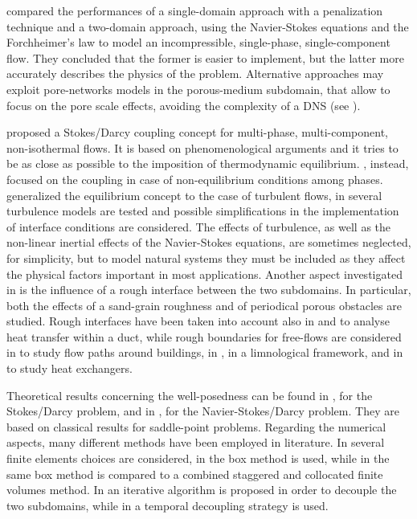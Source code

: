 \textcite{intro:discacim} compared the performances of a single-domain approach with a penalization technique and a 
two-domain approach, using the Navier-Stokes equations and the Forchheimer's 
law to model an incompressible, single-phase, single-component flow. They 
concluded that the former is easier to implement, but the latter more accurately describes the physics of the problem. Alternative approaches may exploit 
pore-networks models in the porous-medium subdomain, that allow to focus on the 
pore scale effects, avoiding the complexity of a DNS (see \cite{paper:kilian}).

\textcite{paper:mosthaf} proposed a Stokes/Darcy coupling concept for multi-phase, 
multi-component, non-isothermal flows. It is based on phenomenological arguments and it tries to be as close as possible to the 
imposition of thermodynamic equilibrium. \textcite{intro:davarzani}, instead, focused on the coupling in case of non-equilibrium conditions among phases.
\textcite{paper:fetzer} generalized the equilibrium concept to the case of 
turbulent flows, in \cite{tesi:fetzer} several turbulence models are tested and 
possible simplifications in the implementation of interface conditions are 
considered. The effects of turbulence, as well as the non-linear inertial 
effects of the Navier-Stokes equations, are sometimes neglected, for 
simplicity, 
but to model natural systems they must be included as they
affect the physical factors important in most applications.
Another aspect investigated in 
\cite{tesi:fetzer} is the influence of a rough interface between the two 
subdomains. In particular, both the effects of a sand-grain roughness and of 
periodical porous obstacles are studied.
Rough interfaces have been taken into account also in \cite{intro:kuzbek} and \cite{intro:kuz} to analyse heat transfer within a duct, while rough boundaries for free-flows are considered in \cite{lien:obstacles} to study flow paths around buildings, in \cite{intro:limnology}, in a limnological framework, and in \cite{intro:targui} to study heat exchangers.

Theoretical results concerning the well-posedness can be found in \cite{intro:disca}, for the Stokes/Darcy problem, and in \cite{intro:disca2009}, for the Navier-Stokes/Darcy problem. They are based on classical results for saddle-point problems. Regarding the numerical aspects, many different methods have been employed in literature. In \cite{intro:disca2009} several finite elements choices are considered, in \cite{tesi:mosthaf} the box method is used, while in \cite{tesi:fetzer} the same box method is compared to a combined staggered and collocated finite volumes method. In \cite{intro:disca} an iterative algorithm is proposed in order to decouple the two subdomains, while in \cite{intro:rybak} a temporal decoupling strategy is used.

